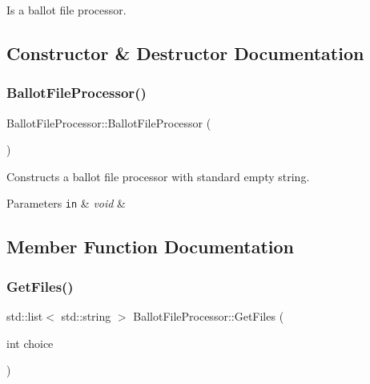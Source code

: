 Is a ballot file processor. 

\subsection{Constructor \& Destructor Documentation}
\mbox{\label{classBallotFileProcessor_ad199c2e246c3a0baf2d6a99e4ddcf144}} 
\subsubsection{\texorpdfstring{Ballot\+File\+Processor()}{BallotFileProcessor()}}
{\footnotesize\ttfamily Ballot\+File\+Processor\+::\+Ballot\+File\+Processor (\begin{DoxyParamCaption}{ }\end{DoxyParamCaption})}



Constructs a ballot file processor with standard empty string. 


\begin{DoxyParams}[1]{Parameters}
\mbox{\tt in}  & {\em void} & \\
\hline
\end{DoxyParams}


\subsection{Member Function Documentation}
\mbox{\label{classBallotFileProcessor_a23b892165d81f5b5441733ca49a30cd5}} 
\subsubsection{\texorpdfstring{Get\+Files()}{GetFiles()}}
{\footnotesize\ttfamily std\+::list$<$ std\+::string $>$ Ballot\+File\+Processor\+::\+Get\+Files (\begin{DoxyParamCaption}\item[{int}]{choice }\end{DoxyParamCaption})}



